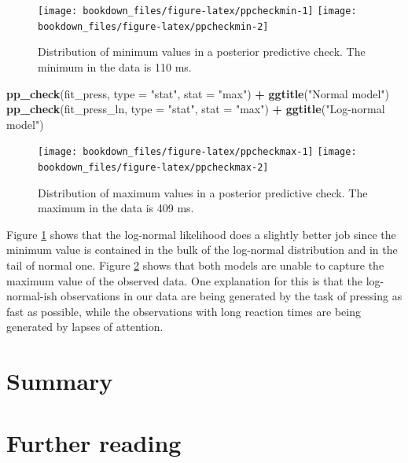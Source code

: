 \documentclass[12pt,]{krantz}
\newenvironment{Shaded}{\begin{snugshade}}{\end{snugshade}}
\newcommand{\DataTypeTok}[1]{\textcolor[rgb]{0.13,0.29,0.53}{#1}}
\newcommand{\KeywordTok}[1]{\textcolor[rgb]{0.13,0.29,0.53}{\textbf{#1}}}
\newcommand{\NormalTok}[1]{#1}
\newcommand{\OperatorTok}[1]{\textcolor[rgb]{0.81,0.36,0.00}{\textbf{#1}}}
\newcommand{\StringTok}[1]{\textcolor[rgb]{0.31,0.60,0.02}{#1}}
\theoremstyle{definition}
\theoremstyle{definition}
\theoremstyle{definition}
\theoremstyle{remark}
\begin{document}
\begin{figure}
\texttt{[image: bookdown\_files/figure-latex/ppcheckmin-1]} \texttt{[image: bookdown\_files/figure-latex/ppcheckmin-2]} \caption{Distribution of minimum values in a posterior predictive check. The minimum in the data is 110 ms.}\label{fig:ppcheckmin}
\end{figure}

\begin{Shaded}
\begin{Highlighting}[]
\KeywordTok{pp_check}\NormalTok{(fit_press, }\DataTypeTok{type =} \StringTok{"stat"}\NormalTok{, }\DataTypeTok{stat =} \StringTok{"max"}\NormalTok{) }\OperatorTok{+}\StringTok{ }\KeywordTok{ggtitle}\NormalTok{(}\StringTok{"Normal model"}\NormalTok{)}
\KeywordTok{pp_check}\NormalTok{(fit_press_ln, }\DataTypeTok{type =} \StringTok{"stat"}\NormalTok{, }\DataTypeTok{stat =} \StringTok{"max"}\NormalTok{) }\OperatorTok{+}\StringTok{ }\KeywordTok{ggtitle}\NormalTok{(}\StringTok{"Log-normal model"}\NormalTok{)}
\end{Highlighting}
\end{Shaded}

\begin{figure}
\texttt{[image: bookdown\_files/figure-latex/ppcheckmax-1]} \texttt{[image: bookdown\_files/figure-latex/ppcheckmax-2]} \caption{Distribution of maximum values in a posterior predictive check. The maximum in the data is 409 ms.}\label{fig:ppcheckmax}
\end{figure}

Figure \ref{fig:ppcheckmin} shows that the log-normal likelihood does a slightly better job since the minimum value is contained in the bulk of the log-normal distribution and in the tail of normal one. Figure \ref{fig:ppcheckmax} shows that both models are unable to capture the maximum value of the observed data. One explanation for this is that the log-normal-ish observations in our data are being generated by the task of pressing as fast as possible, while the observations with long reaction times are being generated by lapses of attention.

\hypertarget{summary}{%
\section{Summary}\label{summary}}

\hypertarget{further-reading-2}{%
\section{Further reading}\label{further-reading-2}}
\end{document}

